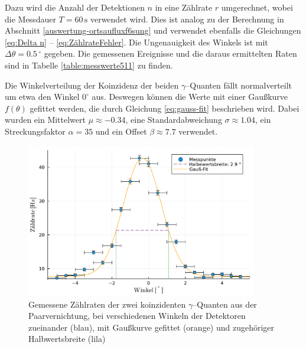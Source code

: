 \documentclass[12pt,a4paper]{scrartcl}
\numberwithin{equation}{section} %
\begin{document}
Dazu wird die Anzahl der Detektionen $n$ in eine Zählrate $r$ umgerechnet, wobei die Messdauer $T=60\,\mathrm{s}$ verwendet wird. Dies ist analog zu der Berechnung in Abschnitt \ref{auswertung-ortsaufluxf6sung}  und verwendet ebenfalls die Gleichungen \eqref{eq:Delta n} -- \eqref{eq:ZählrateFehler}. Die Ungenauigkeit des Winkels ist mit $\Delta \theta = 0.5\,^\circ$ gegeben. Die gemessenen Ereignisse und die daraus ermittelten Raten sind in Tabelle \ref{table:messwerte511} zu finden.

Die Winkelverteilung der Koinzidenz der beiden $\gamma$--Quanten fällt normalverteilt um etwa den Winkel $0^\circ$ aus. Deswegen können die Werte mit einer Gaußkurve $f(\theta)$ gefittet werden, die durch Gleichung \eqref{eq:gauss-fit} beschrieben wird. Dabei wurden ein Mittelwert $\mu\approx-0.34$, eine Standardabweichung $\sigma\approx 1.04$, ein Streckungsfaktor $\alpha=35$ und ein Offset $\beta\approx7.7$ verwendet.

\begin{figure}[h]
	\centering
	\includegraphics[width=0.9\textwidth]{../media/B3.4/plot511.pdf}
	\caption{Gemessene Zählraten der zwei koinzidenten $\gamma$--Quanten aus der Paarvernichtung, bei verschiedenen Winkeln der Detektoren zueinander (blau), mit Gaußkurve gefittet (orange) und zugehöriger Halbwertsbreite (lila)}
	\label{fig:plot511}
\end{figure}
\end{document}
